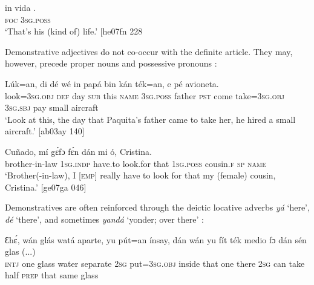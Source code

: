 \ea%
    \label{ex:key:199}
    \gll {} in    vida    .\\
\textsc{foc}\textstylePichiexamplenumberZchnZchn{} \textsc{3sg.poss}     \\

\glt ‘That’s his (kind of) life.’ [he07fn 228\textstylePichiexamplenumberZchnZchn{]}
\z

Demonstrative adjectives do not co-occur with the definite article. They may, however, precede proper nouns  and possessive pronouns :


\ea%
    \label{ex:key:200}
    \gll Lúk=an,    di  dé  wé     in    papá
bin  kán    ték=an,    e    pé  avioneta.\\
look=\textsc{3sg.obj}  \textsc{def}  day  \textsc{sub}  this  \textsc{name}  \textsc{3sg.poss}  father 
\textsc{pst}  come  take=\textsc{3sg.obj}  \textsc{3sg.sbj}  pay  {small aircraft}\\

\glt ‘Look at this, the day that Paquita’s father came to take her, 
he hired a small aircraft.’ [ab03ay 140]
\z


\ea%
    \label{ex:key:201}
    \gll Cuñado,      mí    gɛ́fɔ    fɛ́n    dán  mi
  ó,  Cristina.\\
brother-in-law  \textsc{1sg.indp}  have.to  look.for  that  \textsc{1sg.poss} 
cousin.\textsc{f}  \textsc{sp}  \textsc{name}\\

\glt ‘Brother(-in-law), I [\textsc{emp}] really have to look for that my 
(female) cousin, Cristina.’ [ge07ga 046]
\z

Demonstratives are often reinforced through the deictic locative adverbs \textit{yá} ‘here’, \textit{dé} ‘there’, and sometimes\textit{ yandá} ‘yonder; over there’ :


\ea%
    \label{ex:key:202}
    \gll Ɛhɛ́,    wán  glás    watá  aparte,  yu  pút=an    ínsay,  dán  wán
    yu  fít  ték    medio  fɔ  dán    sén    glas  (...)\\
\textsc{intj}    one  glass  water  separate  \textsc{2sg}  put=\textsc{3sg.obj}  inside  that  one
there  \textsc{2sg}  can  take    half    \textsc{prep}  that    same  glass  \\

